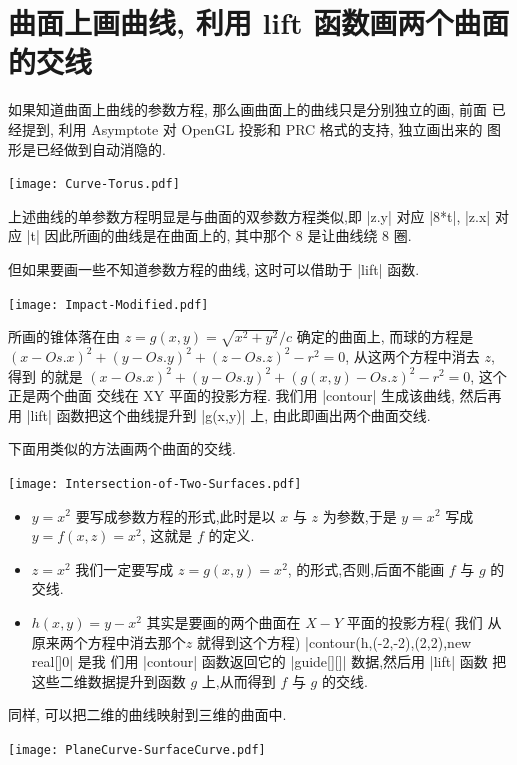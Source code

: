 \documentclass{ctexbook}
\begin{document}
\section{曲面上画曲线, 利用 lift 函数画两个曲面的交线}
如果知道曲面上曲线的参数方程, 那么画曲面上的曲线只是分别独立的画, 前面
已经提到, 利用 Asymptote 对 OpenGL 投影和 PRC 格式的支持, 独立画出来的
图形是已经做到自动消隐的.
\begin{center}\texttt{[image: Curve-Torus.pdf]}\end{center}%

上述曲线的单参数方程明显是与曲面的双参数方程类似,即 |z.y| 对应 |8*t|,
|z.x| 对应 |t| 因此所画的曲线是在曲面上的, 其中那个 8 是让曲线绕 8 圈.

但如果要画一些不知道参数方程的曲线, 这时可以借助于 |lift| 函数.
\begin{center}\texttt{[image: Impact-Modified.pdf]}\end{center}%

所画的锥体落在由 $z=g(x,y)=\sqrt{x^2+y^2}/c$ 确定的曲面上, 而球的方程是
$(x-Os.x)^2+(y-Os.y)^2+(z-Os.z)^2-r^2=0$, 从这两个方程中消去 $z$, 得到
的就是 $(x-Os.x)^2+(y-Os.y)^2+(g(x,y)-Os.z)^2-r^2=0$, 这个正是两个曲面
交线在 XY 平面的投影方程. 我们用 |contour| 生成该曲线, 然后再用 |lift|
函数把这个曲线提升到 |g(x,y)| 上, 由此即画出两个曲面交线.

下面用类似的方法画两个曲面的交线.
\begin{center}\texttt{[image: Intersection-of-Two-Surfaces.pdf]}\end{center}%

\begin{itemize}
\item $y=x^2$ 要写成参数方程的形式,此时是以 $x$ 与 $z$ 为参数,于是
  $y=x^2$ 写成  $y=f(x,z)=x^2$, 这就是 $f$ 的定义.
\item $z=x^2$ 我们一定要写成 $z=g(x,y)=x^2$, 的形式,否则,后面不能画 $f$ 与 $g$ 的交线.
\item $h(x,y)=y-x^2$ 其实是要画的两个曲面在 $X-Y$ 平面的投影方程( 我们
  从原来两个方程中消去那个$z$ 就得到这个方程)
  |contour(h,(-2,-2),(2,2),new real[]{0}|   是我
  们用  |contour| 函数返回它的 |guide[][]| 数据,然后用 |lift| 函数
  把这些二维数据提升到函数 $g$ 上,从而得到 $f$ 与 $g$ 的交线.
\end{itemize}
同样, 可以把二维的曲线映射到三维的曲面中.
\begin{center}\texttt{[image: PlaneCurve-SurfaceCurve.pdf]}\end{center}%

\end{document}
